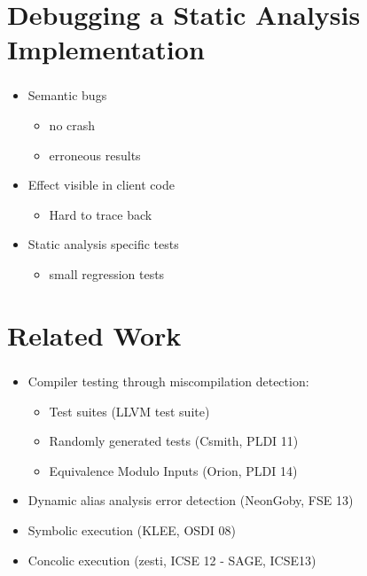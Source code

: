 \documentclass[mathserif,10pt]{beamer}
\begin{document}
\section{Debugging a Static Analysis Implementation}
\frame
{
  \frametitle{\secname}
  \begin{itemize} [<+->]
    \item Semantic bugs
    \begin{itemize}
      \item no crash
      \item erroneous results
    \end{itemize} 
    \vspace{1cm}
    \item Effect visible in client code
    \begin{itemize}
      \item Hard to trace back
    \end{itemize} 
    \vspace{1cm}
    \item Static analysis specific tests
    \begin{itemize}
      \item small regression tests
    \end{itemize} 
  \end{itemize} 
}

\section{Related Work}
\frame
{
  \frametitle{\secname}
  \begin{itemize} [<+->]
    \item Compiler testing through miscompilation detection:
    \begin{itemize}
      \item Test suites (LLVM test suite)
      \item Randomly generated tests (Csmith, PLDI 11)
      \item Equivalence Modulo Inputs (Orion, PLDI 14)
    \end{itemize} 
    \vspace{1cm}
    \item Dynamic alias analysis error detection (NeonGoby, FSE 13)

    \vspace{1cm}
    \item Symbolic execution (KLEE, OSDI 08) 
    \item Concolic execution (zesti, ICSE 12 - SAGE, ICSE13)
  \end{itemize} 
}
\end{document}
